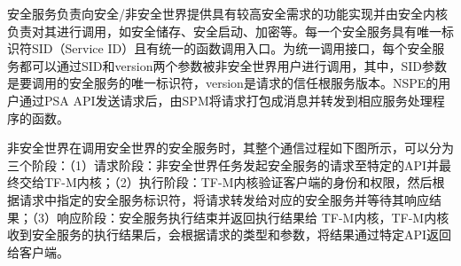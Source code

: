 \documentclass[12pt,a4paper]{ctexart}
\numberwithin{figure}{section}
\begin{document}
\par 安全服务负责向安全/非安全世界提供具有较高安全需求的功能实现并由安全内核负责对其进行调用，如安全储存、安全启动、加密等。每一个安全服务具有唯一标识符SID（Service ID）且有统一的函数调用入口。为统一调用接口，每个安全服务都可以通过SID和version两个参数被非安全世界用户进行调用，其中，SID参数是要调用的安全服务的唯一标识符，version是请求的信任根服务版本。NSPE的用户通过PSA API发送请求后，由SPM将请求打包成消息并转发到相应服务处理程序的函数。
\par 非安全世界在调用安全世界的安全服务时，其整个通信过程如下图所示，可以分为三个阶段：（1）请求阶段：非安全世界任务发起安全服务的请求至特定的API并最终交给TF-M内核；（2）执行阶段：TF-M内核验证客户端的身份和权限，然后根据请求中指定的安全服务标识符，将请求转发给对应的安全服务并等待其响应结果；（3）响应阶段：安全服务执行结束并返回执行结果给 TF-M内核，TF-M内核收到安全服务的执行结果后，会根据请求的类型和参数，将结果通过特定API返回给客户端。
\end{document}
